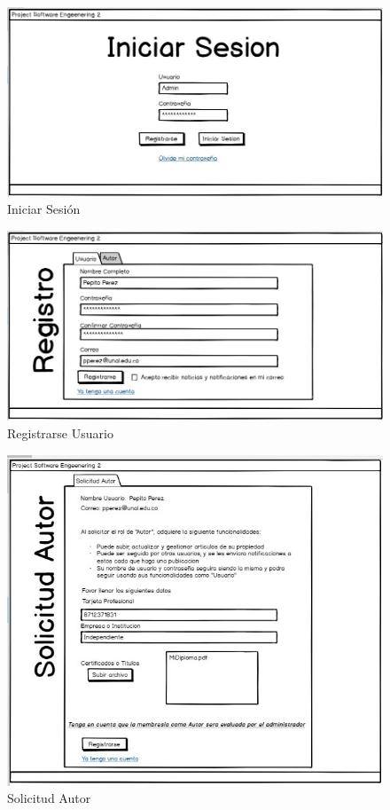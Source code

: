 \documentclass[a4paper,12 pt]{article}
\begin{document}
\begin{figure}[H]
    \centering
    \includegraphics[scale = 1]{images/IniciarSesion.jpg}
    \caption{Iniciar Sesión}
    \label{F101}
\end{figure}{}

\begin{figure}[H]
    \centering
    \includegraphics[scale = 1]{images/RegistrarseUsuario.jpg}
    \caption{Registrarse Usuario}
    \label{F102}
\end{figure}{}

\begin{figure}[H]
    \centering
    \includegraphics[scale = 1.4]{images/SolicitudAutor.jpg}
    \caption{Solicitud Autor}
    \label{F103}
\end{figure}{}
\end{document}
